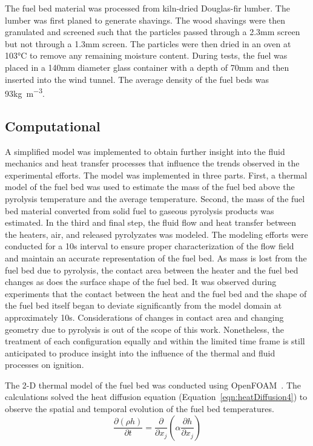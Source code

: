    The fuel bed material was processed from kiln-dried Douglas-fir lumber. The lumber was first planed to generate shavings. The wood shavings were then granulated and screened such that the particles passed through a 2.3\si{\milli\meter} screen but not through a 1.3\si{\milli\meter} screen. The particles were then dried in an oven at 103\si{\celsius} to remove any remaining moisture content. During tests, the fuel was placed in a 140\si{\milli\meter} diameter glass container with a depth of 70\si{\milli\meter} and then inserted into the wind tunnel. The average density of the fuel beds was 93\si{\kilo\gram\per\cubic\meter}.
    
    \subsection{Computational}
    
    A simplified model was implemented to obtain further insight into the fluid mechanics and heat transfer processes that influence the trends observed in the experimental efforts. The model was implemented in three parts. First, a thermal model of the fuel bed was used to estimate the mass of the fuel bed above the pyrolysis temperature and the average temperature. Second, the mass of the fuel bed material converted from solid fuel to gaseous pyrolysis products was estimated. In the third and final step, the fluid flow and heat transfer between the heaters, air, and released pyrolyzates was modeled. The modeling efforts were conducted for a 10\si{\second} interval to ensure proper characterization of the flow field and maintain an accurate representation of the fuel bed. As mass is lost from the fuel bed due to pyrolysis, the contact area between the heater and the fuel bed changes as does the surface shape of the fuel bed. It was observed during experiments that the contact between the heat and the fuel bed and the shape of the fuel bed itself began to deviate significantly from the model domain at approximately 10\si{\second}. Considerations of changes in contact area and changing geometry due to pyrolysis is out of the scope of this work. Nonetheless, the treatment of each configuration equally and within the limited time frame is still anticipated to produce insight into the influence of the thermal and fluid processes on ignition. 
    
    The 2-D thermal model of the fuel bed was conducted using OpenFOAM~\cite{Foundation2020}. The calculations solved the heat diffusion equation (Equation~\ref{eqn:heatDiffusion4}) to observe the spatial and temporal evolution of the fuel bed temperatures.
        \begin{equation}
            \frac{\partial \left(\rho h \right)}{\partial t} = \frac{\partial}{\partial x_{j}} \left( \alpha \frac{\partial h}{\partial x_{j}} \right)
            \label{eqn:heatDiffusion4}
        \end{equation}
    
